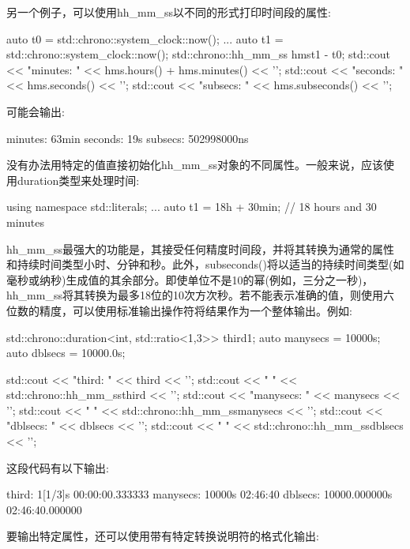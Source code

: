 另一个例子，可以使用hh\_mm\_ss以不同的形式打印时间段的属性:

\begin{cpp}
auto t0 = std::chrono::system_clock::now();
...
auto t1 = std::chrono::system_clock::now();
std::chrono::hh_mm_ss hms{t1 - t0};
std::cout << "minutes: " << hms.hours() + hms.minutes() << '\n';
std::cout << "seconds: " << hms.seconds() << '\n';
std::cout << "subsecs: " << hms.subseconds() << '\n';
\end{cpp}

可能会输出:

\begin{shell}
minutes: 63min
seconds: 19s
subsecs: 502998000ns
\end{shell}

没有办法用特定的值直接初始化hh\_mm\_ss对象的不同属性。一般来说，应该使用duration类型来处理时间:

\begin{cpp}
using namespace std::literals;
...
auto t1 = 18h + 30min; // 18 hours and 30 minutes
\end{cpp}

hh\_mm\_ss最强大的功能是，其接受任何精度时间段，并将其转换为通常的属性和持续时间类型小时、分钟和秒。此外，subseconds()将以适当的持续时间类型(如毫秒或纳秒)生成值的其余部分。即使单位不是10的幂(例如，三分之一秒)，hh\_mm\_ss将其转换为最多18位的10次方次秒。若不能表示准确的值，则使用六位数的精度，可以使用标准输出操作符将结果作为一个整体输出。例如:

\begin{cpp}
std::chrono::duration<int, std::ratio<1,3>> third{1};
auto manysecs = 10000s;
auto dblsecs = 10000.0s;

std::cout << "third: " << third << '\n';
std::cout << " " << std::chrono::hh_mm_ss{third} << '\n';
std::cout << "manysecs: " << manysecs << '\n';
std::cout << " " << std::chrono::hh_mm_ss{manysecs} << '\n';
std::cout << "dblsecs: " << dblsecs << '\n';
std::cout << " " << std::chrono::hh_mm_ss{dblsecs} << '\n';
\end{cpp}

这段代码有以下输出:

\begin{shell}
third:    1[1/3]s
          00:00:00.333333
manysecs: 10000s
          02:46:40
dblsecs:  10000.000000s
          02:46:40.000000
\end{shell}

要输出特定属性，还可以使用带有特定转换说明符的格式化输出:


